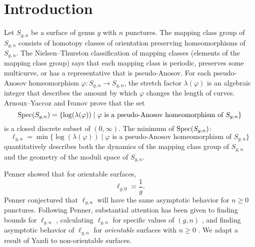 \section{Introduction}
\label{sec:introduction}

Let $S_{g,n}$ be a surface of genus $g$ with $n$ punctures.  The mapping class group of $S_{g,n}$ consists of homotopy classes of orientation preserving homeomorphisms of $S_{g,n}$.  The Nielsen--Thurston classification of mapping classes (elements of the mapping class group) says that each mapping class is periodic, preserves some multicurve, or has a representative that is pseudo-Anosov.  For each pseudo-Anosov homeomorphism $\varphi:S_{g,n}\rightarrow S_{g,n}$, the stretch factor $\lambda(\varphi)$ is an algebraic integer that describes the amount by which $\varphi$ changes the length of curves.  Arnoux--Yaccoz \cite{AY} and Ivanov \cite{ivanov} prove that the set
$$\operatorname{Spec}(S_{g,n})=\{\log(\lambda(\varphi)) \mid \varphi \text{ is a pseudo-Anosov homeomorphism of }S_{g,n}\}$$ is a closed discrete subset of $(0,\infty)$. The minimum of $\operatorname{Spec}(S_{g,n})$:
$$\ell_{g,n}=\min\{\log(\lambda(\varphi)) \mid \varphi \text{ is a pseudo-Anosov homeomorphism of }S_{g,n}\}$$ quantitatively describes both the dynamics of the mapping class group of $S_{g,n}$ and the geometry of the moduli space of $S_{g,n}$.

Penner \cite{penner1991bounds} showed that for orientable surfaces, $$\ell_{g,0}\asymp \frac{1}{g}.$$ %
  Penner conjectured that $\ell_{g,n}$ will have the same asymptotic behavior for  $n\geq0$ punctures.  Following Penner, substantial attention has been given to finding bounds for $\ell_{g,n}$ \cite{AD,bauer,hironaka,HK,HK20,KT,Loving,minakawa}, calculating $\ell_{g,n}$ for specific values of $(g,n)$ \cite{CH,HS,LT,SKL}, and finding asymptotic behavior of $\ell_{g,n}$ for {\it orientable} surfaces with $n\geq 0$ \cite{KT,tsai2009asymptotic,valdivia,yazdi2018pseudo}.  We adapt a result of Yazdi \cite{yazdi2018pseudo} to non-orientable surfaces. %

